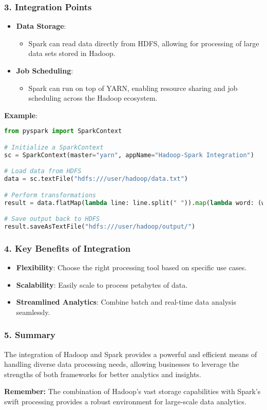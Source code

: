 \documentclass[aspectratio=169]{beamer}
\begin{document}
\begin{frame}[fragile]
    \frametitle{3. Integration Points}
    \begin{itemize}
        \item \textbf{Data Storage}:
        \begin{itemize}
            \item Spark can read data directly from HDFS, allowing for processing of large data sets stored in Hadoop.
        \end{itemize}
        \item \textbf{Job Scheduling}:
        \begin{itemize}
            \item Spark can run on top of YARN, enabling resource sharing and job scheduling across the Hadoop ecosystem.
        \end{itemize}
    \end{itemize}
    
    \textbf{Example}:
    \begin{lstlisting}[language=Python]
from pyspark import SparkContext

# Initialize a SparkContext
sc = SparkContext(master="yarn", appName="Hadoop-Spark Integration")

# Load data from HDFS
data = sc.textFile("hdfs:///user/hadoop/data.txt")

# Perform transformations
result = data.flatMap(lambda line: line.split(" ")).map(lambda word: (word, 1)).reduceByKey(lambda a, b: a + b)

# Save output back to HDFS
result.saveAsTextFile("hdfs:///user/hadoop/output/")
    \end{lstlisting}
\end{frame}

\begin{frame}
    \frametitle{4. Key Benefits of Integration}
    \begin{itemize}
        \item \textbf{Flexibility}: Choose the right processing tool based on specific use cases.
        \item \textbf{Scalability}: Easily scale to process petabytes of data.
        \item \textbf{Streamlined Analytics}: Combine batch and real-time data analysis seamlessly.
    \end{itemize}
\end{frame}

\begin{frame}
    \frametitle{5. Summary}
    The integration of Hadoop and Spark provides a powerful and efficient means of handling diverse data processing needs, allowing businesses to leverage the strengths of both frameworks for better analytics and insights.
    
    \textbf{Remember:} The combination of Hadoop’s vast storage capabilities with Spark’s swift processing provides a robust environment for large-scale data analytics.
\end{frame}
\end{document}
